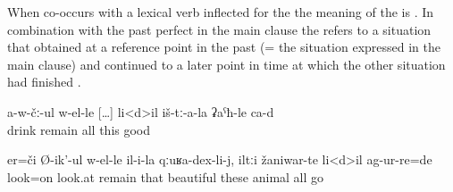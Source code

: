 When  co-occurs with a lexical verb inflected for the  the meaning of the  is  . In combination with the past perfect in the main clause the  refers to a situation that obtained at a reference point in the past (= the situation expressed in the main clause) and continued to a later point in time at which the other situation had finished .
%
\begin{exe}
	\ex	\label{ex:‎While until / as long as he is not drinking, everything is good for them}
	\gll	a-w-čː-ul	w-el-le	[\ldots]	li<d>il	iš-tː-a-la	ʡaˁħ-le	ca-d\\
		drink	remain	{}	all	this	good	\\
	\glt	{}

	\ex	\label{ex:‎‎‎The poor man took the stone}
	\gll	er=či	Ø-ik'-ul	w-el-le	il-i-la	qːuʁa-dex-li-j,	iltːi	žaniwar-te	li<d>il	ag-ur-re=de\\
		look=on	look.at	remain	that	beautiful	these	animal	all	go\\
	\glt	{}
\end{exe}

